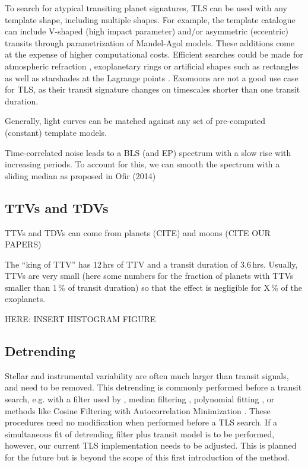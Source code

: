 \documentclass[twocolumn,tighten,longauthor]{myaastex62}
\begin{document}
To search for atypical transiting planet signatures, TLS can be used with any template shape, including multiple shapes. For example, the template catalogue can include V-shaped (high impact parameter) and/or asymmetric (eccentric) transits through parametrization of Mandel-Agol models. These additions come at the expense of higher computational costs. Efficient searches could be made for atmospheric refraction \citep{2017ApJ...848...91D,2018AAS...23112802D}, exoplanetary rings \citep{2004ApJ...616.1193B,2009ApJ...690....1O,2011ApJ...743...97T,2017AJ....153..193A,2018NewA...60...88H} or artificial shapes such as rectangles \citep{2005ApJ...627..534A} as well as starshades at the Lagrange points \citep{2017MNRAS.469.4455G,2018RNAAS...2b..34M}. Exomoons are not a good use case for TLS, as their transit signature changes on timescales shorter than one transit duration.

Generally, light curves can be matched against any set of pre-computed (constant) template models.

Time-correlated noise leads to a BLS (and EP) spectrum with a slow rise with increasing periods. To account for this, we can smooth the spectrum with a sliding median as proposed in Ofir (2014)


\subsection{TTVs and TDVs}
TTVs and TDVs can come from planets (CITE) and moons (CITE OUR PAPERS)

The ``king of TTV'' \citep[Kepler-88,][]{2013ApJ...777....3N} has 12\,hrs of TTV and a transit duration of 3.6\,hrs. Usually, TTVs are very small (here some numbers for the fraction of planets with TTVs smaller than 1\,\% of transit duration) so that the effect is negligible for X\,\% of the exoplanets.

HERE: INSERT HISTOGRAM FIGURE


\subsection{Detrending}
Stellar and instrumental variability are often much larger than transit signals, and need to be removed. This detrending is commonly performed before a transit search, e.g. with a \citet{1964AnaCh..36.1627S} filter used by \citep{2011ApJS..197....6G},
median filtering \citep[e.g.,][]{2012Sci...337..556C,2013A&A...553A..30T}, 
polynomial fitting \citep[e.g.,][]{2014A&A...571A..37S,2012ApJ...749...15G}, or methods like Cosine Filtering with Autocorrelation Minimization \citep[CoFiAM,][]{2013ApJ...770..101K,2018arXiv180604672R}. These procedures need no modification when performed before a TLS search. If a simultaneous fit of detrending filter plus transit model is to be performed, however, our current TLS implementation needs to be adjusted. This is planned for the future but is beyond the scope of this first introduction of the method.
\end{document}
